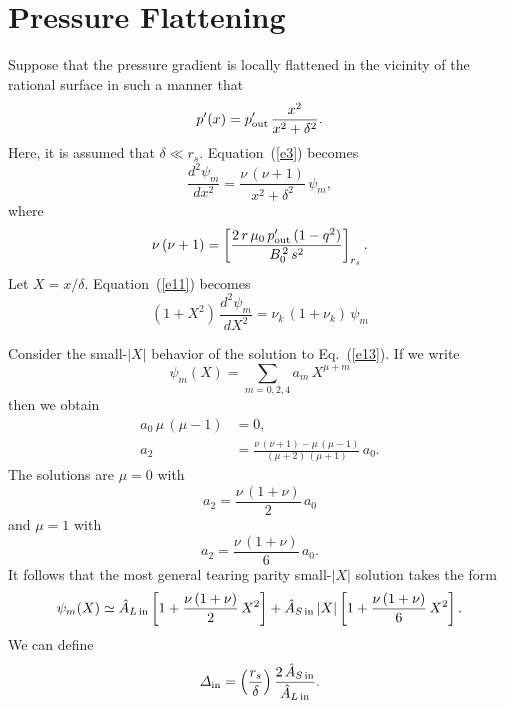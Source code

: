 \documentclass[12pt,prb,aps,notitlepage]{revtex4-1}
\begin{document}
\section{Pressure Flattening}
Suppose that the pressure gradient is locally flattened in the vicinity of the rational surface in such a manner that
\begin{equation}
p'(x) = p'_{\rm out}\,\frac{x^2}{x^2+\delta^2}.
\end{equation}
Here, it is assumed that $\delta\ll r_s$. 
Equation~(\ref{e3}) becomes 
\begin{equation}\label{e11}
\frac{d^2\psi_{m}}{dx^2} =\frac{\nu\,(\nu+1)}{x^2+\delta^2}\,\psi_{m},
\end{equation}
where 
\begin{equation}
\nu\,(\nu+1)=   \left[\frac{2\,r\,\mu_0\,p'_{\rm out}\,(1-q^2)}{B_0^{\,2}\,s^2}\right]_{r_s}.
\end{equation}
Let $X=x/\delta$. Equation~(\ref{e11}) becomes
\begin{equation}\label{e13}
(1+X^2)\,\frac{d^2\psi_m}{dX^2}= \nu_k\,(1+\nu_k)\,\psi_m
\end{equation}

Consider the small-$|X|$ behavior of the solution to Eq.~(\ref{e13}). If we write
\begin{equation}
\psi_m(X) = \sum_{m=0,2,4}a_m\,X^{\mu+m}
\end{equation}
then we obtain
\begin{align}
a_0\,\mu\,(\mu-1) &= 0,\\[0,5ex]
a_2 &= \frac{\nu\,(\nu+1)-\mu\,(\mu-1)}{(\mu+2)\,(\mu+1)}\,a_0.
\end{align}
The solutions are
$\mu=0$ with
\begin{equation}
a_2 =\frac{\nu\,(1+\nu)}{2}\,a_0
\end{equation}
and
$\mu=1$ with
\begin{equation}
a_2 = \frac{\nu\,(1+\nu)}{6}\,a_0.
\end{equation}
It follows that the most general tearing parity small-$|X|$ solution takes the form 
\begin{equation}\label{in}
\psi_m(X) \simeq \hat{A}_{L\,{\rm in}}\left[1+\frac{\nu\,(1+\nu)}{2}\,X^2\right] + \hat{A}_{S\,{\rm in}}\,|X|\left[1+\frac{\nu\,(1+\nu)}{6}\,X^2\right].
\end{equation}
We can define
\begin{equation}\label{din}
{\mit\Delta}_{\rm in} = \left(\frac{r_s}{\delta}\right)
\frac{2\,\hat{A}_{S \,{\rm in}}}{\hat{A}_{L\,{\rm in}}}.
\end{equation}
\end{document}
